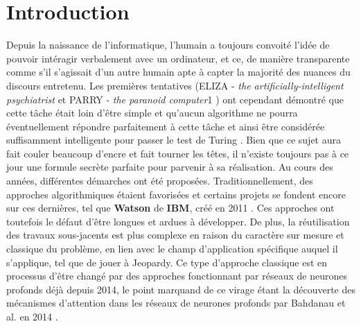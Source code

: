 \section{Introduction}

Depuis la naissance de l'informatique, l'humain a toujours convoité l'idée de pouvoir intéragir verbalement avec un ordinateur, et ce, de manière transparente comme s'il s'agissait d'un autre humain apte à capter la majorité des nuances du discours entretenu. Les premières tentatives (ELIZA - \textit{the artificially-intelligent psychiatrist} \cite{elizaWeizenbaum} et PARRY - \textit{the paranoid computer}1 \cite{parryCerf}) ont cependant démontré que cette tâche était loin d'être simple et qu'aucun algorithme ne pourra éventuellement répondre parfaitement à cette tâche et ainsi être considérée suffisamment intelligente pour passer le test de Turing \cite{turingTest}. Bien que ce sujet aura fait couler beaucoup d'encre et fait tourner les têtes, il n'existe toujours pas à ce jour une formule secrète parfaite pour parvenir à sa réalisation. Au cours des années, différentes démarches ont été proposées. Traditionnellement, des approches algorithmiques étaient favorisées et certains projets se fondent encore sur ces dernières, tel que \textbf{Watson} de \textbf{IBM}, créé en 2011 \cite{ibmWatson}. Ces approches ont toutefois le défaut d'être longues et ardues à développer. De plus, la réutilisation des travaux sous-jacents est plus complexe en raison du caractère sur mesure et classique du problème, en lien avec le champ d'application spécifique auquel il s'applique, tel que de jouer à Jeopardy. Ce type d'approche classique est en processus d'être changé par des approches fonctionnant par réseaux de neurones profonds déjà depuis 2014, le point marquand de ce virage étant la découverte des mécanismes d'attention dans les réseaux de neurones profonds par Bahdanau et al. en 2014 \cite{attentionMechanism}.  \\


